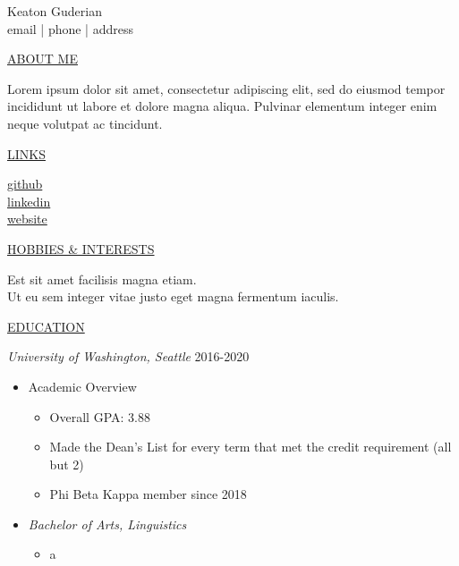 \documentclass[11pt]{article}
\newcommand{\resumetitle}[3]{
    \AddToShipoutPictureBG{
        \AtPageUpperLeft {
        \raisebox{-0.09\paperheight}{
            \color{black!85}\rule{2\paperwidth}{\paperheight}}
        }}
    \begin{Center}
        \begingroup
        \titlethin
        \color{black!10}\Huge{#1}
        \titlethick
        \color{black!5}\Huge{#2} \\
        \vspace{2mm}
        \textrm{\color{black!15}\Large{#3}}
        \endgroup
    \end{Center}
    \vspace{7mm}
}
\newcommand{\betteruline}[1]{
    \uline{#1}
}
\newcommand{\sectiontitle}[1]{
    \begingroup
        \titlebold
        \betteruline{\Large\uppercase{#1}  }
        \vspace{1.7mm}
    \endgroup
}
\newcommand{\sectioncontent}[1]{
    \begingroup
        \begin{FlushLeft}
        \vspace{-3mm}
        \sffamily\small#1
        \end{FlushLeft}
    \endgroup
    \vspace{2mm}
}
\newcommand{\honor}[2]{
    \textcolor{black!70}{#1} - #2 \\
    \vspace{1.5mm}
}
\begin{document}
    \resumetitle{Keaton}{Guderian} {
        email |
        phone |
        address
    }

    \setlength{\columnsep}{7mm}
    \begin{paracol}{2}

    \sectiontitle{about me}
    \sectioncontent{
        Lorem ipsum dolor sit amet, consectetur adipiscing elit, sed do eiusmod tempor incididunt ut labore et dolore magna aliqua. Pulvinar elementum integer enim neque volutpat ac tincidunt.
    }

    \sectiontitle{links}
    \sectioncontent{
        \hspace{2mm}
        \href{example.com}{github} \\
        \faIcon{linkedin-in}\hspace{2.1mm}
        \href{example.com}{linkedin} \\
        \faIcon{link}\hspace{1.8mm}
        \href{example.com}{website}
    }

    \iffalse

    \sectiontitle{Honors \& Awards}
    \sectioncontent{
        \honor{Date}{Lacus suspendisse faucibus interdum posuere lorem ipsum dolor sit amet.}
        \honor{Date}{ Libero justo laoreet sit amet cursus sit amet.}
        \honor{Date}{ Est velit egestas dui id ornare arcu odio ut sem. Phasellus vestibulum lorem sed risus ultricies tristique nulla aliquet.}

    }

      \fi

    \sectiontitle{Hobbies \& Interests}
    \sectioncontent{
        Est sit amet facilisis magna etiam.\\
        Ut eu sem integer vitae justo eget magna fermentum iaculis. \\
    }

    \switchcolumn


    \sectiontitle{education}
    \sectioncontent{
      
        \begingroup
      \textit{University of Washington, Seattle }\hfill\color{black!70}\small{2016-2020}

        \endgroup


    \begin{itemize}

      \item Academic Overview

        \begin{itemize}
          \item Overall GPA: 3.88
          \item Made the Dean's List for every term that met the credit requirement (all but 2)
          \item Phi Beta Kappa member since 2018
        \end{itemize}
      \item \textit{Bachelor of Arts, Linguistics }
        \begin{itemize}
          \item a


\end{itemize}
\end{itemize}}
\end{paracol}
\end{document}
